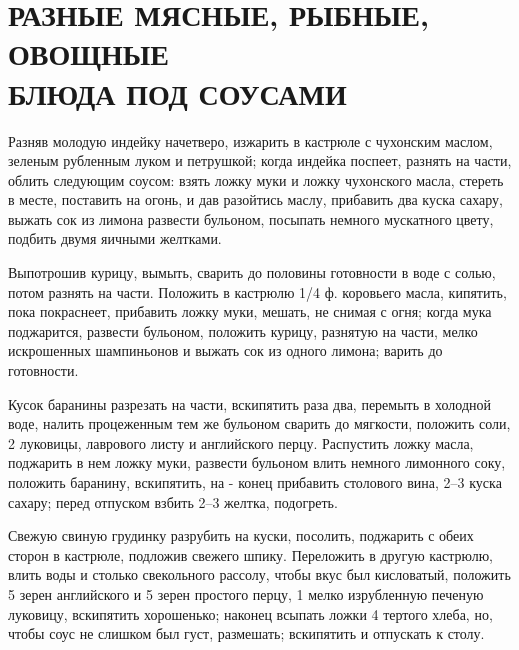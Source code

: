\section{РАЗНЫЕ МЯСНЫЕ, РЫБНЫЕ, ОВОЩНЫЕ \\БЛЮДА ПОД СОУСАМИ} %


Разняв молодую индейку начетверо, изжарить в кастрюле с чухонским маслом, зеленым рубленным луком и петрушкой; когда индейка поспеет, разнять на части, облить следующим соусом: взять ложку муки и ложку чухонского масла, стереть в месте, поставить на огонь, и дав разойтись маслу, прибавить два куска сахару, выжать сок из лимона развести бульоном, посыпать немного мускатного цвету, подбить двумя яичными желтками. 


Выпотрошив курицу, вымыть, сварить до половины готовности в воде с солью, потом разнять на части. Положить в кастрюлю 1/4 ф. коровьего масла, кипятить, пока покраснеет, прибавить ложку муки, мешать, не снимая с огня; когда мука поджарится, развести бульоном, положить курицу, разнятую на части, мелко искрошенных шампиньонов и выжать сок из одного лимона; варить до готовности. 


Кусок баранины разрезать на части, вскипятить раза два, перемыть в холодной воде, налить процеженным тем же бульоном сварить до мягкости, положить соли, 2 луковицы, лаврового листу и английского перцу. Распустить ложку масла, поджарить в нем ложку муки, развести бульоном влить немного лимонного соку, положить баранину, вскипятить, на - конец прибавить столового вина, 2--3 куска сахару; перед отпуском взбить 2--3 желтка, подогреть. 


Свежую свиную грудинку разрубить на куски, посолить, поджарить с обеих сторон в кастрюле, подложив свежего шпику. Переложить в другую кастрюлю, влить воды и столько свекольного рассолу, чтобы вкус был кисловатый, положить 5 зерен английского и 5 зерен простого перцу, 1 мелко изрубленную печеную луковицу, вскипятить хорошенько; наконец всыпать ложки 4 тертого хлеба, но, чтобы соус не слишком был густ, размешать; вскипятить и отпускать к столу. 


